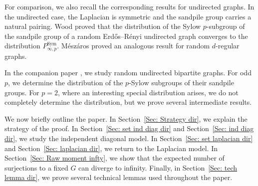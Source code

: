 \documentclass[12pt]{amsart}
\newtheorem{theorem}{Theorem}[section]
\theoremstyle{definition}
\newcommand{\PPP}{\mathbb{P}}
\newcommand{\Sym}{\text{Sym}}
\newcommand{\msympinf}{P^{\Sym}_{\infty,p}}
\newcommand{\rank}{\text{rank}}
\begin{document}
For comparison, we also recall the corresponding results for undirected graphs. In the undirected case, the Laplacian is symmetric and the sandpile group carries a natural pairing.
Wood \cite{wood2017distribution} proved that the distribution of the Sylow $p$-subgroup of the sandpile group of a random Erd\H{o}s--R\'enyi undirected graph converges to the distribution $\msympinf$.
M\'esz\'aros \cite{meszaros2020distribution} proved an analogous result for random $d$-regular graphs.

























In the companion paper \cite{Singhal_SandpileBipartite_Undirected}, we study random undirected bipartite graphs. For odd $p$, we determine the distribution of the $p$-Sylow subgroups of their sandpile groups. For $p=2$, where an interesting special distribution arises, we do not completely determine the distribution, but we prove several intermediate results.


We now briefly outline the paper. In Section~\ref{Sec: Strategy dir}, we explain the strategy of the proof. 
In Section~\ref{Sec: set ind diag dir} and Section~\ref{Sec: ind diag dir}, we study the independent diagonal model. 
In Section~\ref{Sec: set laplacian dir} and Section~\ref{Sec: laplacian dir}, we return to the Laplacian model. 
In Section~\ref{Sec: Raw moment infty}, we show that the expected number of surjections to a fixed $G$ can diverge to infinity. 
Finally, in Section~\ref{Sec: tech lemma dir}, we prove several technical lemmas used throughout the paper.
\end{document}

